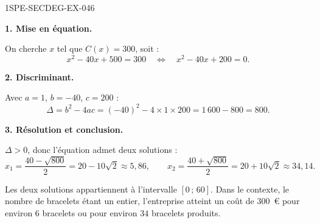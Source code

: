 \begin{corrige}{1SPE-SECDEG-EX-046}

\textbf{1. Mise en équation.}


On cherche $x$ tel que $C(x) = 300$, soit :
\[
x^2 - 40x + 500 = 300 \quad \Longleftrightarrow \quad x^2 - 40x + 200 = 0.
\]

\medskip
\textbf{2. Discriminant.}

Avec $a = 1$, $b = -40$, $c = 200$ :
\[
\Delta = b^2 - 4ac = (-40)^2 - 4 \times 1 \times 200 = 1\,600 - 800 = 800.
\]

\medskip
\textbf{3. Résolution et conclusion.}


$\Delta > 0$, donc l'équation admet deux solutions :
\[
x_1 = \frac{40 - \sqrt{800}}{2} = 20 - 10\sqrt{2} \approx 5{,}86, \qquad x_2 = \frac{40 + \sqrt{800}}{2} = 20 + 10\sqrt{2} \approx 34{,}14.
\]

Les deux solutions appartiennent à l'intervalle $[0\,;\,60]$. Dans le contexte, le nombre de bracelets étant un entier, l'entreprise atteint un coût de $300$~€ pour environ $6$ bracelets ou pour environ $34$ bracelets produits.

\end{corrige}
